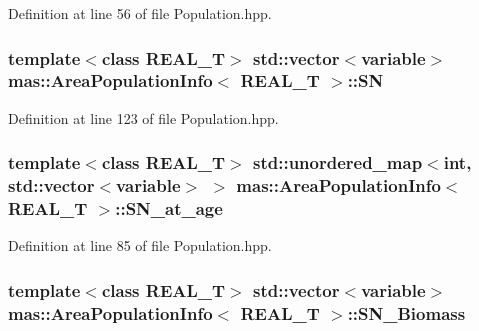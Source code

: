 Definition at line 56 of file Population.\-hpp.

\hypertarget{structmas_1_1_area_population_info_a3e1b6deaa2b9795de4dcd18c9cfe1efa}{
\subsubsection[{S\-N}]{\setlength{\rightskip}{0pt plus 5cm}template$<$class R\-E\-A\-L\-\_\-\-T$>$ std\-::vector$<${\bf variable}$>$ {\bf mas\-::\-Area\-Population\-Info}$<$ R\-E\-A\-L\-\_\-\-T $>$\-::S\-N}}\label{structmas_1_1_area_population_info_a3e1b6deaa2b9795de4dcd18c9cfe1efa}


Definition at line 123 of file Population.\-hpp.

\hypertarget{structmas_1_1_area_population_info_a6a1fab6322320fae5353b34c22b710ec}{
\subsubsection[{S\-N\-\_\-at\-\_\-age}]{\setlength{\rightskip}{0pt plus 5cm}template$<$class R\-E\-A\-L\-\_\-\-T$>$ std\-::unordered\-\_\-map$<$int, std\-::vector$<${\bf variable}$>$ $>$ {\bf mas\-::\-Area\-Population\-Info}$<$ R\-E\-A\-L\-\_\-\-T $>$\-::S\-N\-\_\-at\-\_\-age}}\label{structmas_1_1_area_population_info_a6a1fab6322320fae5353b34c22b710ec}


Definition at line 85 of file Population.\-hpp.

\hypertarget{structmas_1_1_area_population_info_a4244c6789b2e4d8de445344523c12bf5}{
\subsubsection[{S\-N\-\_\-\-Biomass}]{\setlength{\rightskip}{0pt plus 5cm}template$<$class R\-E\-A\-L\-\_\-\-T$>$ std\-::vector$<${\bf variable}$>$ {\bf mas\-::\-Area\-Population\-Info}$<$ R\-E\-A\-L\-\_\-\-T $>$\-::S\-N\-\_\-\-Biomass}}\label{structmas_1_1_area_population_info_a4244c6789b2e4d8de445344523c12bf5}


